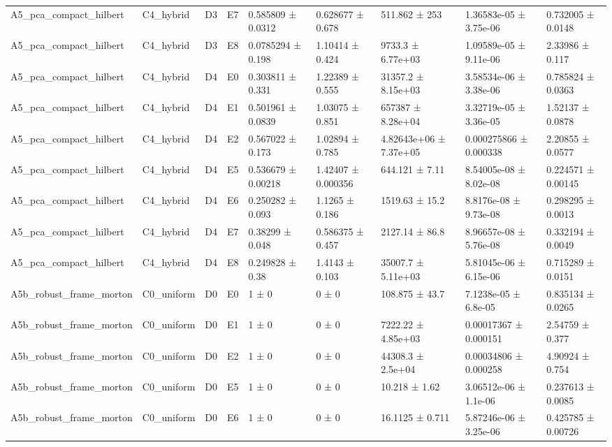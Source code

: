\begin{table}
\begin{tabular}{lllllllll}
A5\_pca\_compact\_hilbert & C4\_hybrid & D3 & E7 & 0.585809 ± 0.0312 & 0.628677 ± 0.678 & 511.862 ± 253 & 1.36583e-05 ± 3.75e-06 & 0.732005 ± 0.0148 \\
A5\_pca\_compact\_hilbert & C4\_hybrid & D3 & E8 & 0.0785294 ± 0.198 & 1.10414 ± 0.424 & 9733.3 ± 6.77e+03 & 1.09589e-05 ± 9.11e-06 & 2.33986 ± 0.117 \\
A5\_pca\_compact\_hilbert & C4\_hybrid & D4 & E0 & 0.303811 ± 0.331 & 1.22389 ± 0.555 & 31357.2 ± 8.15e+03 & 3.58534e-06 ± 3.38e-06 & 0.785824 ± 0.0363 \\
A5\_pca\_compact\_hilbert & C4\_hybrid & D4 & E1 & 0.501961 ± 0.0839 & 1.03075 ± 0.851 & 657387 ± 8.28e+04 & 3.32719e-05 ± 3.36e-05 & 1.52137 ± 0.0878 \\
A5\_pca\_compact\_hilbert & C4\_hybrid & D4 & E2 & 0.567022 ± 0.173 & 1.02894 ± 0.785 & 4.82643e+06 ± 7.37e+05 & 0.000275866 ± 0.000338 & 2.20855 ± 0.0577 \\
A5\_pca\_compact\_hilbert & C4\_hybrid & D4 & E5 & 0.536679 ± 0.00218 & 1.42407 ± 0.000356 & 644.121 ± 7.11 & 8.54005e-08 ± 8.02e-08 & 0.224571 ± 0.00145 \\
A5\_pca\_compact\_hilbert & C4\_hybrid & D4 & E6 & 0.250282 ± 0.093 & 1.1265 ± 0.186 & 1519.63 ± 15.2 & 8.8176e-08 ± 9.73e-08 & 0.298295 ± 0.0013 \\
A5\_pca\_compact\_hilbert & C4\_hybrid & D4 & E7 & 0.38299 ± 0.048 & 0.586375 ± 0.457 & 2127.14 ± 86.8 & 8.96657e-08 ± 5.76e-08 & 0.332194 ± 0.0049 \\
A5\_pca\_compact\_hilbert & C4\_hybrid & D4 & E8 & 0.249828 ± 0.38 & 1.4143 ± 0.103 & 35007.7 ± 5.11e+03 & 5.81045e-06 ± 6.15e-06 & 0.715289 ± 0.0151 \\
A5b\_robust\_frame\_morton & C0\_uniform & D0 & E0 & 1 ± 0 & 0 ± 0 & 108.875 ± 43.7 & 7.1238e-05 ± 6.8e-05 & 0.835134 ± 0.0265 \\
A5b\_robust\_frame\_morton & C0\_uniform & D0 & E1 & 1 ± 0 & 0 ± 0 & 7222.22 ± 4.85e+03 & 0.00017367 ± 0.000151 & 2.54759 ± 0.377 \\
A5b\_robust\_frame\_morton & C0\_uniform & D0 & E2 & 1 ± 0 & 0 ± 0 & 44308.3 ± 2.5e+04 & 0.00034806 ± 0.000258 & 4.90924 ± 0.754 \\
A5b\_robust\_frame\_morton & C0\_uniform & D0 & E5 & 1 ± 0 & 0 ± 0 & 10.218 ± 1.62 & 3.06512e-06 ± 1.1e-06 & 0.237613 ± 0.0085 \\
A5b\_robust\_frame\_morton & C0\_uniform & D0 & E6 & 1 ± 0 & 0 ± 0 & 16.1125 ± 0.711 & 5.87246e-06 ± 3.25e-06 & 0.425785 ± 0.00726 \\

\end{tabular}
\end{table}
